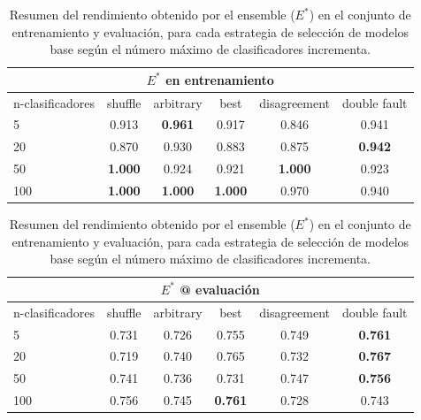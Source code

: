 \begin{table}[H]
    \centering
    
    \begin{tabular}{lccccc}
    \toprule
        \multicolumn{6}{c}{$E^*$ en entrenamiento} \\ \midrule
        n-clasificadores & shuffle & arbitrary & best & disagreement & double fault  \\ \midrule \midrule
        5 & 0.913 & {\bf 0.961} & 0.917 & 0.846 & 0.941 \\
        20 & 0.870 & 0.930 & 0.883 & 0.875 & {\bf 0.942} \\
        50 & {\bf 1.000} & 0.924 & 0.921 & {\bf 1.000} & 0.923 \\
        100 & {\bf 1.000} & {\bf 1.000} & {\bf 1.000} & 0.970 & 0.940 \\
    \bottomrule
    \end{tabular}

    \begin{tabular}{lccccc}
    \toprule
        \multicolumn{6}{c}{$E^*$ @ evaluación} \\ \midrule
        n-clasificadores & shuffle & arbitrary & best & disagreement & double fault  \\ \midrule \midrule
        5 & 0.731 & 0.726 & 0.755 & 0.749 & {\bf 0.761} \\
        20 & 0.719 & 0.740 & 0.765 & 0.732 & {\bf 0.767} \\
        50 & 0.741 & 0.736 & 0.731 & 0.747 & {\bf 0.756} \\
        100 & 0.756 & 0.745 & {\bf 0.761} & 0.728 & 0.743 \\
    \bottomrule
    \end{tabular}

    \caption{Resumen del rendimiento obtenido por el ensemble ($E^*$) en el conjunto de entrenamiento y evaluación, para cada estrategia de selección de modelos base según el número máximo de clasificadores incrementa.}
    \label{table:performance}
\end{table}

